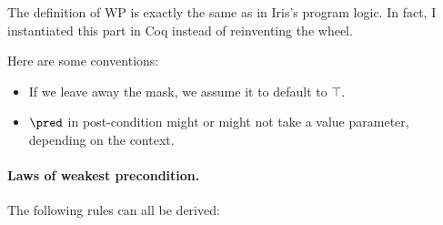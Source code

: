 The definition of WP is exactly the same as in Iris's program logic. In fact, I instantiated this part in Coq instead of reinventing the wheel.

Here are some conventions:

\begin{itemize}
\item If we leave away the mask, we assume it to default to $\top$.
\item $\pred$ in post-condition might or might not take a value parameter, depending on the context.
\end{itemize}

\paragraph{Laws of weakest precondition.}
The following rules can all be derived:
